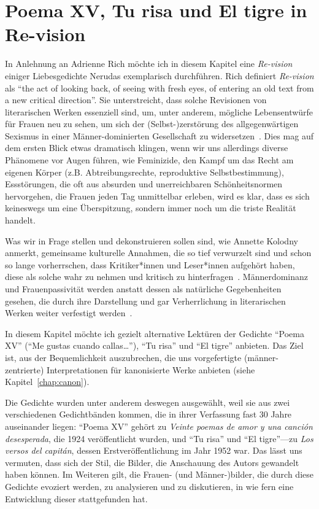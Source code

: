 \section{Poema XV, Tu risa und El tigre in Re-vision}


In Anlehnung an Adrienne Rich möchte ich in diesem Kapitel eine \textit{Re-vision} einiger Liebesgedichte Nerudas exemplarisch durchführen.
Rich definiert \textit{Re-vision} als ``the act of looking back, of seeing with fresh eyes, of entering an old text from a new critical direction''.
Sie unterstreicht, dass solche Revisionen von literarischen Werken essenziell sind, um, unter anderem, mögliche Lebensentwürfe für Frauen neu zu sehen, um sich der (Selbst-)zerstörung des allgegenwärtigen Sexismus in einer Männer-dominierten Gesellschaft zu widersetzen~\cite{Rich1972}.
Dies mag auf dem ersten Blick etwas dramatisch klingen, wenn wir uns allerdings diverse Phänomene vor Augen führen, wie Feminizide, den Kampf um das Recht am eigenen Körper (z.B. Abtreibungsrechte, reproduktive Selbstbestimmung), Essstörungen, die oft aus absurden und unerreichbaren Schönheitsnormen hervorgehen, die Frauen jeden Tag unmittelbar erleben, wird es klar, dass es sich keineswegs um eine Überspitzung, sondern immer noch um die triste Realität handelt.

Was wir in Frage stellen und dekonstruieren sollen sind, wie Annette Kolodny anmerkt, gemeinsame kulturelle Annahmen, die so tief verwurzelt sind und schon so lange vorherrschen, dass Kritiker*innen und Leser*innen aufgehört haben, diese als solche wahr zu nehmen und kritisch zu hinterfragen~\cite{Kolodny1980}.
Männerdominanz und Frauenpassivität werden anstatt dessen als natürliche Gegebenheiten gesehen, die durch ihre Darstellung und gar Verherrlichung in literarischen Werken weiter verfestigt werden~\cite{Duncan1992}.

In diesem Kapitel möchte ich gezielt alternative Lektüren der Gedichte ``Poema XV'' (``Me gustas cuando callas\ldots''), ``Tu risa'' und ``El tigre'' anbieten. 
Das Ziel ist, aus der Bequemlichkeit auszubrechen, die uns vorgefertigte (männer-zentrierte) Interpretationen für kanonisierte Werke anbieten (siehe Kapitel~\ref{chap:canon}).

Die Gedichte wurden unter anderem deswegen ausgewählt, weil sie aus zwei verschiedenen Gedichtbänden kommen, die in ihrer Verfassung fast 30 Jahre auseinander liegen:
``Poema XV'' gehört zu \textit{Veinte poemas de amor y una canción desesperada}, die 1924 veröffentlicht wurden, und ``Tu risa'' und ``El tigre''—zu \textit{Los versos del capitán}, dessen Erstveröffentlichung im Jahr 1952 war.
Das lässt uns vermuten, dass sich der Stil, die Bilder, die Anschauung des Autors gewandelt haben können.
Im Weiteren gilt, die Frauen- (und Männer-)bilder, die durch diese Gedichte evoziert werden, zu analysieren und zu diskutieren, in wie fern eine Entwicklung dieser stattgefunden hat.

